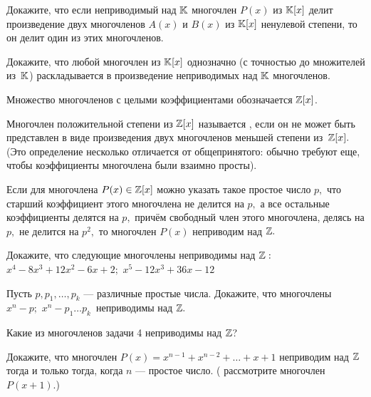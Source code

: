 \documentclass[a4paper,12pt]{article}
\begin{document}
 Докажите, что  если неприводимый над $\mathbb{K}$ многочлен $P(x)$ из $\mathbb{K}[x]$
делит произведение двух
многочленов  $A(x)$  и  $B(x)$  из $\mathbb{K}[x]$ ненулевой степени, то
он делит один из этих многочленов.

 Докажите, что  любой многочлен из $\mathbb{K}[x]$ однозначно (с точностью до
множителей из~$\mathbb{K}$) раскладывается в произведение неприводимых над  $\mathbb{K}$
многочленов.







 Множество многочленов с целыми коэффициентами обозначается $\mathbb{Z}[x]$.


Многочлен положительной степени из  $\mathbb{Z}[x]$  называется
,\/
если он не может быть представлен в виде произведения двух многочленов
меньшей степени из~$\mathbb{Z}[x].$
(Это определение несколько отличается от общепринятого:
обычно требуют еще, чтобы коэффициенты многочлена были
взаимно просты).


 Если для многочлена  $P(x)\in\mathbb{Z}[x]$
можно указать такое простое число  $p,$  что старший коэффициент этого
многочлена не делится на  $p,$  а все остальные коэффициенты делятся на
 $p,$  прич\"ем свободный член этого многочлена, делясь на  $p,$  не делится
на  $p^2,$  то многочлен  $P(x)$  неприводим над  $\mathbb{Z}.$

 Докажите, что  следующие многочлены неприводимы над  $\mathbb{Z}:$\\
 $x^4-8x^3+12x^2-6x+2;$
 $x^5-12x^3+36x-12$

 Пусть  $p,p_1,\dots,p_k$  --- различные простые числа.
Докажите, что  многочлены\\
 $x^n-p;$
 $x^n-p_1\dots p_k\,$  неприводимы над  $\mathbb{Z}.$


 Какие из многочленов задачи 4 неприводимы над  $\mathbb{Z}$?


 Докажите, что  многочлен
$P(x)=x^{n-1}+x^{n-2}+\dots+x+1$  неприводим над  $\mathbb{Z}$
тогда и только тогда, когда  $n$  --- простое число.\quad
( рассмотрите многочлен  $P(x+1)$.)




\GenXMLW
\end{document}
